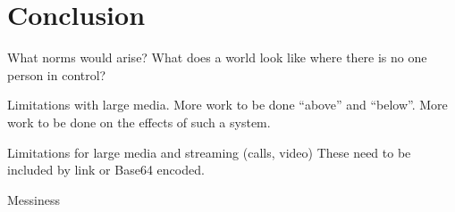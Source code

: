 \section{Conclusion}

What norms would arise?
What does a world look like where there is no one person in control?

Limitations with large media.
More work to be done ``above'' and ``below''.
More work to be done on the effects of such a system.

Limitations for large media and streaming (calls, video)
These need to be included by link or Base64 encoded.

Messiness

